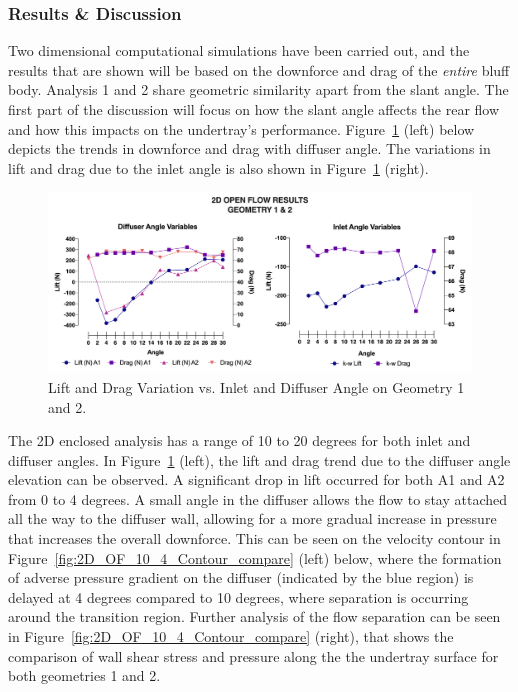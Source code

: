 \subsubsection{Results \& Discussion}

\noindent Two dimensional computational simulations have been carried out, and the results that are shown will be based on the downforce and drag of the \textit{entire} bluff body. Analysis 1 and 2 share geometric similarity apart from the slant angle. The first part of the discussion will focus on how the slant angle affects the rear flow and how this impacts on the undertray's performance. Figure~\ref{fig:2D_OF_A12_results} (left) below depicts the trends in downforce and drag with diffuser angle. The variations in lift and drag due to the inlet angle is also shown in Figure~\ref{fig:2D_OF_A12_results} (right).

\begin{figure}[!ht]
    \centering
    \includegraphics[scale = 0.6]{Figures/Graph/2D_OF_A1-2.png}
    \caption{Lift and Drag Variation vs. Inlet and Diffuser Angle on Geometry 1 and 2.}
    \label{fig:2D_OF_A12_results}
\end{figure}

\noindent The 2D enclosed analysis has a range of 10 to 20 degrees for both inlet and diffuser angles. In Figure~\ref{fig:2D_OF_A12_results} (left), the lift and drag trend due to the diffuser angle elevation can be observed. A significant drop in lift occurred for both A1 and A2 from 0 to 4 degrees. A small angle in the diffuser allows the flow to stay attached all the way to the diffuser wall, allowing for a more gradual increase in pressure that increases the overall downforce. This can be seen on the velocity contour in Figure~\ref{fig:2D_OF_10_4_Contour_compare} (left) below, where the formation of adverse pressure gradient on the diffuser (indicated by the blue region) is delayed at 4 degrees compared to 10 degrees, where separation is occurring around the transition region. Further analysis of the flow separation can be seen in Figure~\ref{fig:2D_OF_10_4_Contour_compare} (right), that shows the comparison of wall shear stress and pressure along the the undertray surface for both geometries 1 and 2. 

